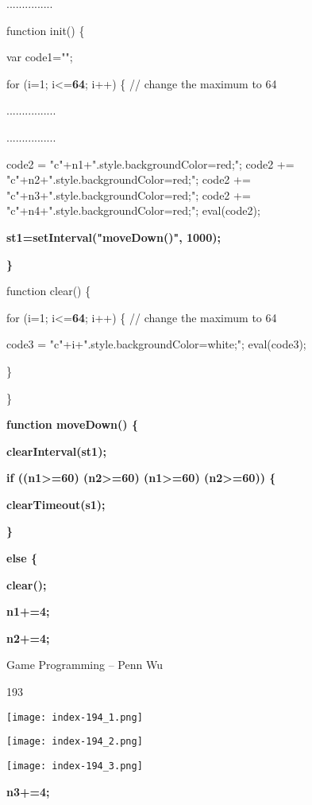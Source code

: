\documentclass[
]{article}
\begin{document}
...............

function init() \{

var code1="";

for (i=1; i\textless=\textbf{64}; i++) \{ // change the maximum to 64

................

................

code2 =
"c"+n1+".style.backgroundColor=\textquotesingle red\textquotesingle;";
code2 +=
"c"+n2+".style.backgroundColor=\textquotesingle red\textquotesingle;";
code2 +=
"c"+n3+".style.backgroundColor=\textquotesingle red\textquotesingle;";
code2 +=
"c"+n4+".style.backgroundColor=\textquotesingle red\textquotesingle;";
eval(code2);

\textbf{st1=setInterval("moveDown()", 1000);}

\textbf{\}}

\textbf{}

function clear() \{

for (i=1; i\textless=\textbf{64}; i++) \{ // change the maximum to 64

code3 =
"c"+i+".style.backgroundColor=\textquotesingle white\textquotesingle;";
eval(code3);

\}

\}

\textbf{}

\textbf{function moveDown() \{}

\textbf{clearInterval(st1);}

\textbf{}

\textbf{if ((n1\textgreater=60) \textbar\textbar{} (n2\textgreater=60)
\textbar\textbar{} (n1\textgreater=60) \textbar\textbar{}
(n2\textgreater=60)) \{}

\textbf{clearTimeout(s1);}

\textbf{\}}

\textbf{else \{}

\textbf{clear();}

\textbf{n1+=4;}

\textbf{n2+=4;}

Game Programming -- Penn Wu

193

\protect\hypertarget{index_split_011.htmlux5cux23p194}{}{}\texttt{[image: index-194\_1.png]}

\texttt{[image: index-194\_2.png]}

\texttt{[image: index-194\_3.png]}

\textbf{n3+=4;}
\end{document}
